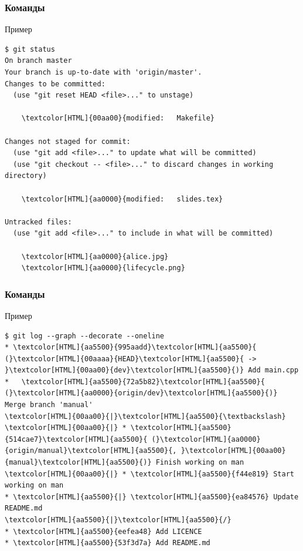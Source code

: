 \documentclass[pdf,russian]{beamer}
\begin{document}
\begin{frame}[fragile]
    \frametitle{Команды}
    \begin{exampleblock}{Пример}
        \begin{Verbatim}[fontsize=\relsize{-3},commandchars=\\\{\}]
$ git status
On branch master
Your branch is up-to-date with 'origin/master'.
Changes to be committed:
  (use "git reset HEAD <file>..." to unstage)

	\textcolor[HTML]{00aa00}{modified:   Makefile}

Changes not staged for commit:
  (use "git add <file>..." to update what will be committed)
  (use "git checkout -- <file>..." to discard changes in working directory)

	\textcolor[HTML]{aa0000}{modified:   slides.tex}

Untracked files:
  (use "git add <file>..." to include in what will be committed)

	\textcolor[HTML]{aa0000}{alice.jpg}
	\textcolor[HTML]{aa0000}{lifecycle.png}
        \end{Verbatim}
    \end{exampleblock}
\end{frame}

\begin{frame}[fragile]
    \frametitle{Команды}
    \begin{exampleblock}{Пример}
        \begin{Verbatim}[commandchars=\\\{\}]
$ git log --graph --decorate --oneline
* \textcolor[HTML]{aa5500}{995aadd}\textcolor[HTML]{aa5500}{ (}\textcolor[HTML]{00aaaa}{HEAD}\textcolor[HTML]{aa5500}{ -> }\textcolor[HTML]{00aa00}{dev}\textcolor[HTML]{aa5500}{)} Add main.cpp
*   \textcolor[HTML]{aa5500}{72a5b82}\textcolor[HTML]{aa5500}{ (}\textcolor[HTML]{aa0000}{origin/dev}\textcolor[HTML]{aa5500}{)} Merge branch 'manual'
\textcolor[HTML]{00aa00}{|}\textcolor[HTML]{aa5500}{\textbackslash}
\textcolor[HTML]{00aa00}{|} * \textcolor[HTML]{aa5500}{514cae7}\textcolor[HTML]{aa5500}{ (}\textcolor[HTML]{aa0000}{origin/manual}\textcolor[HTML]{aa5500}{, }\textcolor[HTML]{00aa00}{manual}\textcolor[HTML]{aa5500}{)} Finish working on man
\textcolor[HTML]{00aa00}{|} * \textcolor[HTML]{aa5500}{f44e819} Start working on man
* \textcolor[HTML]{aa5500}{|} \textcolor[HTML]{aa5500}{ea84576} Update README.md
\textcolor[HTML]{aa5500}{|}\textcolor[HTML]{aa5500}{/}
* \textcolor[HTML]{aa5500}{eefea48} Add LICENCE
* \textcolor[HTML]{aa5500}{53f3d7a} Add README.md
        \end{Verbatim}
    \end{exampleblock}
\end{frame}
\end{document}
